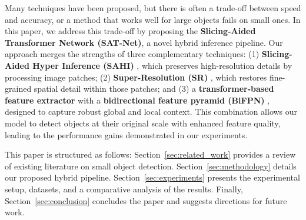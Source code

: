 Many techniques have been proposed, but there is often a trade-off between speed and accuracy, or a method that works well for large objects fails on small ones.
In this paper, we address this trade-off by proposing the \textbf{Slicing-Aided Transformer Network (SAT-Net)}, a novel hybrid inference pipeline. Our approach merges the strengths of three complementary techniques: (1) \textbf{Slicing-Aided Hyper Inference (SAHI)} \cite{aksoy2022slicing}, which preserves high-resolution details by processing image patches; (2) \textbf{Super-Resolution (SR)} \cite{li2025superresolution}, which restores fine-grained spatial detail within those patches; and (3) a \textbf{transformer-based feature extractor} \cite{zhu2021deformable} with a \textbf{bidirectional feature pyramid (BiFPN)} \cite{tan2020efficientdet}, designed to capture robust global and local context. This combination allows our model to detect objects at their original scale with enhanced feature quality, leading to the performance gains demonstrated in our experiments.

This paper is structured as follows:
Section~\ref{sec:related_work} provides a review of existing literature on small object detection.
Section~\ref{sec:methodology} details our proposed hybrid pipeline.
Section~\ref{sec:experiments} presents the experimental setup, datasets, and a comparative analysis of the results.
Finally, Section~\ref{sec:conclusion} concludes the paper and suggests directions for future work.